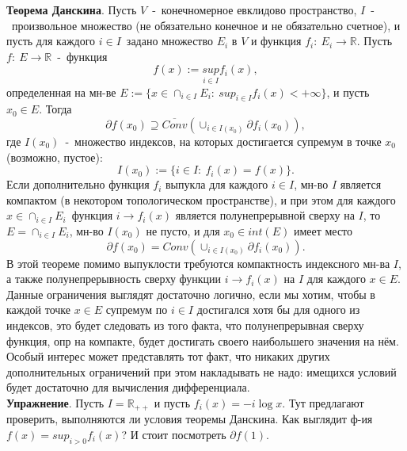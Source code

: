 \textbf{Теорема Данскина}. Пусть $V$~-~конечномерное евклидово пространство, $I$~-~произвольное множество (не обязательно конечное и не обязательно счетное), и пусть для каждого $i \in I$~задано множество $E_i$ в $V$ и функция $f_i:~E_i \to \mathbb{R}$. Пусть $f:~E \to \mathbb{R}$~-~функция
$$
f(x):=\underset{i \in I}{sup}f_i(x),
$$
определенная на мн-ве $E := \{x \in \cap_{i \in I}E_i:~sup_{i \in I}f_i(x)<+\infty\}$, и пусть $x_0 \in E$. Тогда
$$
\partial f(x_0) \supseteq \overline{Conv}(\cup_{i \in I(x_0)}\partial f_i(x_0)),
$$
где $I(x_0)$~-~множество индексов, на которых достигается супремум в точке $x_0$ (возможно, пустое):
$$
I(x_0):=\{i \in I:~f_i(x)=f(x)\}.
$$
Если дополнительно функция $f_i$ выпукла для каждого $i \in I$, мн-во $I$ является компактом (в некотором топологическом пространстве), и при этом для каждого $x \in \cap_{i \in I}E_i$~функция $i \to f_i(x)$ является полунепрерывной сверху на $I$, то $E=\cap_{i \in I}E_i$, мн-во $I(x_0)$ не пусто, и для $x_0 \in int(E)$ имеет место
$$
\partial f(x_0)=Conv(\cup_{i \in I(x_0)}\partial f_i(x_0)).
$$
В этой теореме помимо выпуклости требуются компактность индексного мн-ва $I$, а также полунепрерывность сверху функции $i \to f_i(x)$ на $I$ для каждого $x \in E$. Данные ограничения выглядят достаточно логично, если мы хотим, чтобы в каждой точке $x \in E$ супремум по $i \in I$ достигался хотя бы для одного из индексов, это будет следовать из того факта, что полунепрерывная сверху функция, опр на компакте, будет достигать своего наибольшего значения на нём. Особый интерес может представлять тот факт, что никаких других дополнительных ограничений при этом накладывать не надо: имещихся условий будет достаточно для вычисления дифференциала.\\

\textbf{Упражнение}. Пусть $I=\mathbb{R_{++}}$ и пусть $f_i(x)=-i \log x$. Тут предлагают проверить, выполняются ли условия теоремы Данскина. Как выглядит ф-ия $f(x)=sup_{i > 0}f_i(x)$? И стоит посмотреть $\partial f(1)$.\\

